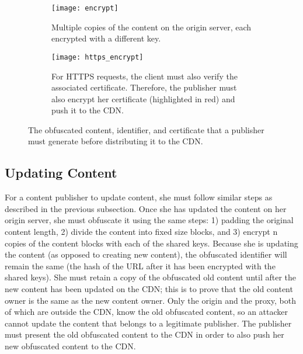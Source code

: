 \begin{figure}[t]
\centering
   \begin{subfigure}[b]{0.45\textwidth}
   \texttt{[image: encrypt]}
   \caption{Multiple copies of the content on the origin server, each encrypted with a different key.}
   \label{fig:encrypt} 
\end{subfigure}

\begin{subfigure}[b]{0.45\textwidth}
   \texttt{[image: https\_encrypt]}
   \caption{For HTTPS requests, the client must also verify the associated certificate.  Therefore, the 
publisher must also encrypt her certificate (highlighted in red) and push it to the CDN.}
   \label{fig:https_encrypt}
\end{subfigure}

\caption{The obfuscated content, identifier, and certificate that a publisher must 
generate before distributing it to the CDN.}
\end{figure}

\subsection{Updating Content}
For a content publisher to update content, she must follow similar steps as described in the previous subsection.  
Once she has updated the content on her origin server, she must obfuscate it using the same steps: 1) padding the 
original content length, 2) divide the content into fixed size blocks, and 3) encrypt n copies of the content blocks 
with each of the shared keys.  Because she is updating the content (as opposed to creating new content), the 
obfuscated identifier will remain the same (the hash of the URL after it has been encrypted with the shared keys).  She must 
retain a copy of the obfuscated old content until after the new content has been updated on the CDN; this is to prove 
that the old content owner is the same as the new content owner.  Only the origin and the proxy, both of which are 
outside the CDN, know the old obfuscated content, so an attacker cannot update the content that belongs to 
a legitimate publisher.  The publisher must present the old obfuscated content to the CDN in order to also push 
her new obfuscated content to the CDN.  

